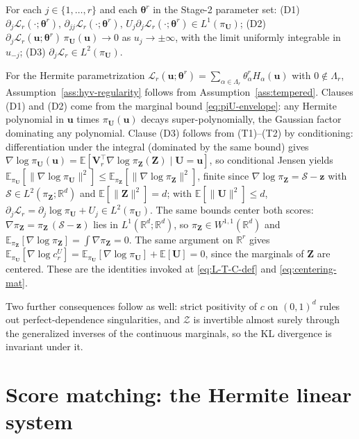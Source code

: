 \documentclass[review,hidelinks,onefignum,onetabnum]{siamart251216}
\newcommand{\RR}{\mathbb{R}}
\newcommand{\EE}{\mathbb{E}}
\newcommand{\mV}{\bm{V}}
\newcommand{\vbeta}{\bm{\theta}^{r}}
\newcommand{\vz}{\bm{z}}
\newcommand{\vZ}{\bm{Z}}
\newcommand{\vu}{\bm{u}}
\newcommand{\vU}{\bm{U}}
\newcommand{\scZ}{\mathcal{Z}}
\newcommand{\scL}{\mathcal{L}}
\newcommand{\scS}{\mathcal{S}}
\begin{document}
\begin{assumption}
\label{ass:hyv-regularity}
For each $j\in\{1,\ldots,r\}$ and each $\vbeta$ in the Stage-2 parameter set:
\textup{(D1)} $\partial_j\scL_r(\cdot;\vbeta),\,\partial_{jj}\scL_r(\cdot;\vbeta),\,U_j\partial_j\scL_r(\cdot;\vbeta)\in L^1(\pi_{\vU})$;
\textup{(D2)} $\partial_j\scL_r(\vu;\vbeta)\,\pi_{\vU}(\vu)\to 0$ as $u_j\to\pm\infty$, with the limit uniformly integrable in $u_{-j}$;
\textup{(D3)} $\partial_j\scL_r\in L^2(\pi_{\vU})$.
\end{assumption}

For the Hermite parametrization $\scL_r(\vu;\vbeta)=\sum_{\alpha \in \Lambda_r}\theta^{r}_\alpha H_\alpha(\vu)$ with $0\notin \Lambda_r$, Assumption~\ref{ass:hyv-regularity} follows from Assumption~\ref{ass:tempered}. Clauses (D1) and (D2) come from the marginal bound \eqref{eq:piU-envelope}: any Hermite polynomial in $\vu$ times $\pi_{\vU}(\vu)$ decays super-polynomially, the Gaussian factor dominating any polynomial. Clause (D3) follows from (T1)--(T2) by conditioning: differentiation under the integral (dominated by the same bound) gives $\nabla\log\pi_{\vU}(\vu) = \EE[\mV_r^\top\nabla\log\pi_{\vZ}(\vZ) \mid \vU = \vu]$, so conditional Jensen yields $\EE_{\pi_{\vU}}[\|\nabla\log\pi_{\vU}\|^2] \le \EE_{\pi_{\vZ}}[\|\nabla\log\pi_{\vZ}\|^2]$, finite since $\nabla\log\pi_{\vZ} = \scS - \vz$ with $\scS \in L^2(\pi_{\vZ};\RR^d)$ and $\EE[\|\vZ\|^2] = d$; with $\EE[\|\vU\|^2] \le d$, $\partial_j\scL_r = \partial_j\log\pi_{\vU} + U_j \in L^2(\pi_{\vU})$. The same bounds center both scores: $\nabla\pi_{\vZ} = \pi_{\vZ}\,(\scS - \vz)$ lies in $L^1(\RR^d;\RR^d)$, so $\pi_{\vZ}\in W^{1,1}(\RR^d)$ and $\EE_{\pi_{\vZ}}[\nabla\log\pi_{\vZ}] = \int\nabla\pi_{\vZ} = 0$. The same argument on $\RR^r$ gives $\EE_{\pi_{\vU}}[\nabla\log c_r^{U}] = \EE_{\pi_{\vU}}[\nabla\log\pi_{\vU}] + \EE[\vU] = 0$, since the marginals of $\vZ$ are centered. These are the identities invoked at \eqref{eq:L-T-C-def} and \eqref{eq:centering-mat}.

Two further consequences follow as well: strict positivity of $c$ on $(0,1)^d$ rules out perfect-dependence singularities, and $\scZ$ is invertible almost surely through the generalized inverses of the continuous marginals, so the KL divergence is invariant under it.


\section{Score matching: the Hermite linear system}
\label{app:stage2-foundations}
\end{document}
